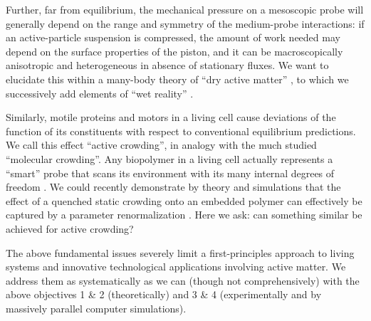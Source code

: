 \begin{workpackage}[id=WPactive,wphases=0-48,
  short=Active Particle Suspensions,%
  title=Probing Active Particle Suspensions with Colloids and Polymers,
  lead=ULEI,
  ULEIRM=96,UNIPDRM=6,USTUTTRM=2]
\begin{wpdescription}
Further, far from equilibrium, the mechanical pressure on a mesoscopic probe will generally depend on the range and 
symmetry of the medium-probe interactions: if an active-particle suspension is compressed, the
amount of work needed may depend on the surface properties of the piston, and it can be macroscopically
anisotropic and heterogeneous in absence of stationary fluxes. 
%
We want to elucidate this within a many-body theory of ``dry active matter'' \cite{marchetti-etal:2013}, 
to which we successively add elements of ``wet reality'' \cite{zoettl-stark:2014}.

Similarly, motile proteins and motors in a living cell cause deviations of the function
of its constituents with respect to conventional equilibrium predictions.  We call this
effect ``active crowding'', in analogy with the much studied ``molecular crowding''. 
%
Any biopolymer in a living cell actually represents a ``smart'' probe that scans its environment with its many 
internal degrees of freedom \cite{otto-etal:2013}.
%
We could recently demonstrate by theory and simulations that the effect of a quenched static crowding onto an embedded
polymer can effectively be captured by a parameter renormalization \cite{schoebl-etal:2014}.  
%
Here we ask: can something similar be achieved for active crowding?

The above fundamental issues severely limit a first-principles approach to living systems and
innovative technological applications involving active matter.
%
We address them as systematically as we can (though not comprehensively) with the above
objectives 1 \& 2 (theoretically) and 3 \& 4 (experimentally and by massively parallel
computer simulations).

\end{wpdescription}

\begin{tasklist}


\end{tasklist}
\end{workpackage}
